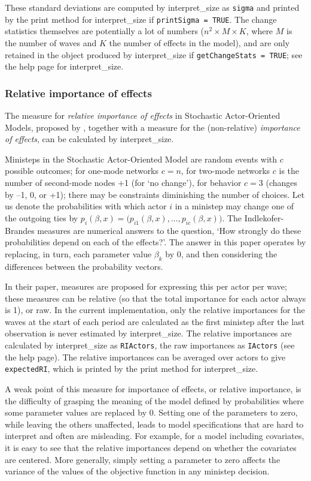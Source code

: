 \documentclass[a4paper,fleqn,11pt]{article}
\newcommand{\+}{\, + \,}
\newcommand{\sfn}[1]{\textsf{#1}}
\newcommand{\saom}{{Stochastic Actor-Oriented Model}}
\begin{document}
These standard deviations are computed by \sfn{interpret\_size} as \texttt{sigma}
and  printed by the print method for \sfn{interpret\_size} if \texttt{printSigma = TRUE}.
The change statistics themselves are potentially a lot of numbers
($n^2 \times M \times K$, where $M$ is the number of waves and $K$
the number of effects in the model), and are only retained in the object
produced by \sfn{interpret\_size} if \texttt{getChangeStats = TRUE};
see the help page for \sfn{interpret\_size}.

\subsubsection{Relative importance of effects}

The measure for \emph{relative importance of effects} in {\saom}s,
proposed by \citet{IndlekoferBrandes2013},
together with a measure for the (non-relative) \emph{importance of effects},
can be calculated by \sfn{interpret\_size}.

Ministeps in the {\saom} are random events with $c$ possible outcomes;
for one-mode networks $c = n$, for two-mode networks $c$ is the
number of second-mode nodes +1 (for `no change'), for behavior
$c=3$ (changes by --1, 0, or +1); there may be constraints
diminishing the number of choices.
Let us denote the probabilities with which
actor $i$ in a ministep may change one of the outgoing ties by
$p_{i}(\beta, x) = \big(p_{i1}(\beta, x), \ldots, p_{ic}(\beta, x)\big)$.
The Indlekofer-Brandes measures are numerical answers to the question,
`How strongly do these probabilities depend on each of the effects?'.
The answer in this paper operates by replacing, in turn,
each parameter value $\beta_k$ by 0, and then considering the differences
between the probability vectors.

In their paper, measures are proposed for expressing this per actor
per wave; these measures can be relative (so that the total importance
for each actor always is 1), or raw. In the current implementation,
only the relative importances for the waves at the start of each period are
calculated as the first ministep after the last observation is never estimated
by \sfn{interpret\_size}.
The relative importances are calculated by  \sfn{interpret\_size} as \texttt{RIActors},
the raw importances as \texttt{IActors} (see the help page).
The  relative importances can be averaged over actors to give
\texttt{expectedRI}, which is printed by the print method for \sfn{interpret\_size}.

A weak point of this measure for importance of effects, or relative importance,
is the difficulty of grasping the meaning of the model defined by
probabilities where some parameter values are replaced by 0.
Setting one of the parameters to zero, while leaving the others unaffected,
leads to model specifications that are hard to interpret
and often are misleading.
For example, for a model including covariates, it is easy to see that
the relative importances depend on whether the covariates are centered.
More generally, simply setting a parameter to zero affects the variance
of the values of the objective function in any ministep decision.
\end{document}

